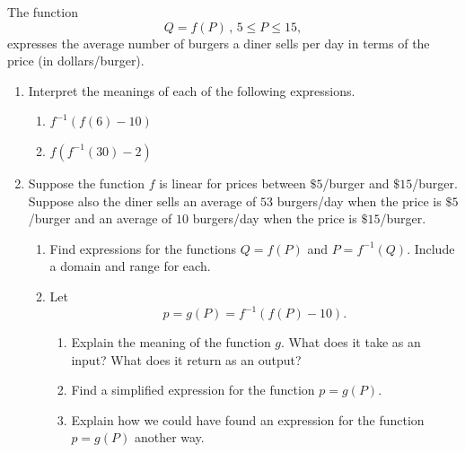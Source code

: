 \documentclass{ximera}
\begin{document}
\begin{example} \label{EW231a}
The function
\[
       Q = f(P) \, , \, 5 \leq P \leq 15,
\]
expresses the average number of burgers a diner sells per day in terms of the price (in dollars/burger).

\begin{enumerate}

\item Interpret the meanings of each of the following expressions.

\begin{enumerate}

\item $f^{-1}(f(6)-10)$

\item $f(f^{-1}(30)-2)$

\end{enumerate}

\item Suppose the function $f$ is linear for prices between $\$5$/burger and  $\$15$/burger. Suppose also the diner sells an average of $53$ burgers/day when the price is $\$5$/burger and an average of $10$ burgers/day when the price is $\$15$/burger.

\begin{enumerate}
\item Find expressions for the functions $Q=f(P)$ and $P=f^{-1}(Q)$. Include a domain and range for 	each.

\item Let 
\[
      p = g(P) =  f^{-1}(f(P)-10).   
\]

\thispagestyle{empty}

\begin{enumerate}
\item Explain the meaning of the function $g$. What does it take as an input? What does it return as an output?

\item Find a simplified expression for the function $p=g(P)$.

\item Explain how we could have found an expression for the function $p=g(P)$ another way.


\end{enumerate}
\end{enumerate}
\end{enumerate}


\end{example}
\end{document}
